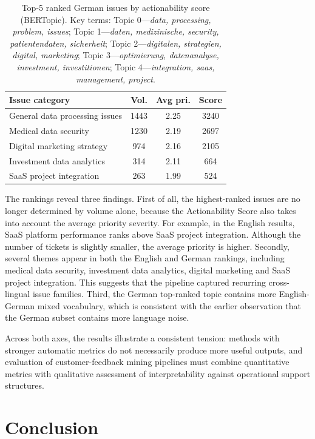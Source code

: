 \documentclass[11pt]{article}
\begin{document}
\begin{table}[H]
\centering
\small
\begin{tabular}{p{3.6cm}ccc}
\toprule
\textbf{Issue category} & \textbf{Vol.} & \textbf{Avg pri.} & \textbf{Score} \\
\midrule
General data processing issues & 1443 & 2.25 & 3240 \\
Medical data security          & 1230 & 2.19 & 2697 \\
Digital marketing strategy     & 974  & 2.16 & 2105 \\
Investment data analytics      & 314  & 2.11 & 664  \\
SaaS project integration       & 263  & 1.99 & 524  \\
\bottomrule
\end{tabular}
\caption{Top-5 ranked German issues by actionability score (BERTopic). Key terms: Topic 0---\textit{data, processing, problem, issues}; Topic 1---\textit{daten, medizinische, security, patientendaten, sicherheit}; Topic 2---\textit{digitalen, strategien, digital, marketing}; Topic 3---\textit{optimierung, datenanalyse, investment, investitionen}; Topic 4---\textit{integration, saas, management, project}.}
\label{tab:ranking_de}
\end{table}
 
The rankings reveal three findings. First of all, the highest-ranked issues are no longer determined by volume alone, because the Actionability Score also takes into account the average priority severity. For example, in the English results, SaaS platform performance ranks above SaaS project integration. Although the number of tickets is slightly smaller, the average priority is higher. Secondly, several themes appear in both the English and German rankings, including medical data security, investment data analytics, digital marketing and SaaS project integration. This suggests that the pipeline captured recurring cross-lingual issue families. Third, the German top-ranked topic contains more English-German mixed vocabulary, which is consistent with the earlier observation that the German subset contains more language noise.
 
Across both axes, the results illustrate a consistent tension: methods with stronger automatic metrics do not necessarily produce more useful outputs, and evaluation of customer-feedback mining pipelines must combine quantitative metrics with qualitative assessment of interpretability against operational support structures.
 
\section{Conclusion}
 
\end{document}
